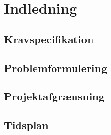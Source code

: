 \section{Indledning}

\subsection{Kravspecifikation}

\subsection{Problemformulering}

\subsection{Projektafgrænsning}

\subsection{Tidsplan}